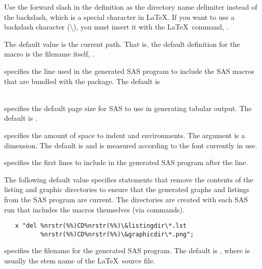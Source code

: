 \documentclass[article,oneside]{memoir}
\begin{document}
\begin{description}
   Use the forward slash in the definition
   as the directory name delimiter instead of the backslash, which is a special
   character in \LaTeX. If you want to use a backslash character (\textbackslash), you
   must insert it with the \LaTeX\ command, .

   The default value is the current path. That is, the default
   definition for the  macro is the filename itself, .

     \item[\cs{SRmacroinclude}] specifies the line used in the generated SAS program to 
     include the SAS macros that are bundled with the  package.
     The default is\\~
     
    \item[\cs{SRpagesize}] specifies the default page size for SAS to use in generating
    tabular output. The default is .
    
    
     \item[\cs{SRparindent}] specifies the amount of space to indent 
      and  environments.
     The argument is a dimension. 
     The default is \Code{3em} and is measured according to the font currently in use. 

     \item[\cs{SRprogramline}] specifies the first lines to include in the generated SAS program
     after the  line.    

     The following default value specifies statements that
     remove the contents of the listing and graphic directories to ensure
     that the generated graphs and listings from the SAS program are current. 
     The directories are created with
     each SAS run that includes the macros themselves (via  commands).
\begin{snugshade}
\begin{verbatim}
   x "del %nrstr(%%)CD%nrstr(%%)\&listingdir\*.lst 
          %nrstr(%%)CD%nrstr(%%)\&graphicdir\*.png"; 
\end{verbatim}
\end{snugshade}

      \item[\cs{SRprogramname}] specifies the filename for the generated SAS
     program. The default is , where  is  
     usually the stem name of the \LaTeX\ source file.
     

\end{description}
\end{document}
